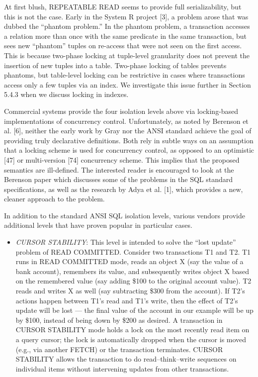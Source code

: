 \documentclass[b5paper,11pt,twoside,openright]{book}
\begin{document}
At first blush, REPEATABLE READ seems to provide full serializability,
but this is not the case. Early in the System R project {[}3{]}, a
problem arose that was dubbed the ``phantom problem.'' In the phantom
problem, a transaction accesses a relation more than once with the same
predicate in the same transaction, but sees new ``phantom'' tuples on
re-access that were not seen on the first access. This is because
two-phase locking at tuple-level granularity does not prevent the
insertion of new tuples into a table. Two-phase locking of tables
prevents phantoms, but table-level locking can be restrictive in cases
where transactions access only a few tuples via an index. We investigate
this issue further in Section 5.4.3 when we discuss locking in indexes.

Commercial systems provide the four isolation levels above via
locking-based implementations of concurrency control. Unfortunately, as
noted by Berenson et al. {[}6{]}, neither the early work by Gray nor the
ANSI standard achieve the goal of providing truly declarative
definitions. Both rely in subtle ways on an assumption that a locking
scheme is used for concurrency control, as opposed to an optimistic
{[}47{]} or multi-version {[}74{]} concurrency scheme. This implies that
the proposed semantics are ill-defined. The interested reader is
encouraged to look at the Berenson paper which discusses some of the
problems in the SQL standard specifications, as well as the research by
Adya et al. {[}1{]}, which provides a new, cleaner approach to the
problem.

In addition to the standard ANSI SQL isolation levels, various vendors
provide additional levels that have proven popular in particular cases.

\begin{itemize}

\item
  \emph{CURSOR STABILITY}: This level is intended to solve the ``lost
  update'' problem of READ COMMITTED. Consider two transactions T1 and
  T2. T1 runs in READ COMMITTED mode, reads an object X (say the value
  of a bank account), remembers its value, and subsequently writes
  object X based on the remembered value (say adding \$100 to the
  original account value). T2 reads and writes X as well (say
  subtracting \$300 from the account). If T2's actions happen between
  T1's read and T1's write, then the effect of T2's update will be lost
  --- the final value of the account in our example will be up by \$100,
  instead of being down by \$200 as desired. A transaction in CURSOR
  STABILITY mode holds a lock on the most recently read item on a query
  cursor; the lock is automatically dropped when the cursor is moved
  (e.g., via another FETCH) or the transaction terminates. CURSOR
  STABILITY allows the transaction to do read--think--write sequences
  on individual items without intervening updates from other
  transactions.
\end{itemize}
\end{document}
